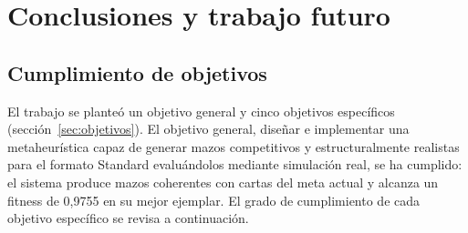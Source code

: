 
\chapter{Conclusiones y trabajo futuro}
\label{cap:conclusiones}

\section{Cumplimiento de objetivos}

El trabajo se planteó un objetivo general y cinco objetivos específicos (sección~\ref{sec:objetivos}). El objetivo general, diseñar e implementar una metaheurística capaz de generar mazos competitivos y estructuralmente realistas para el formato Standard evaluándolos mediante simulación real, se ha cumplido: el sistema produce mazos coherentes con cartas del meta actual y alcanza un fitness de 0,9755 en su mejor ejemplar. El grado de cumplimiento de cada objetivo específico se revisa a continuación.

